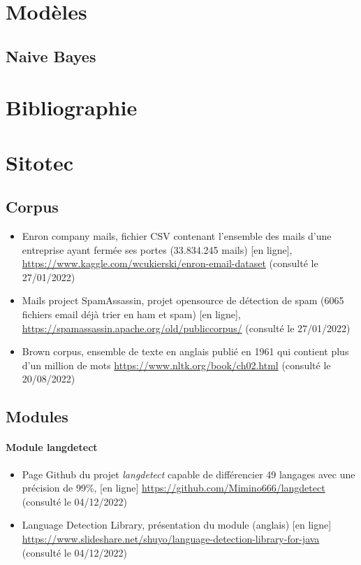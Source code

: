 \documentclass[a4paper,12pt]{article}
\begin{document}
	\section{Modèles}	
		\subsection{Naive Bayes}
	
	\section{Bibliographie}
	
	\section{Sitotec}
		\subsection{Corpus}
			\begin{itemize}
				\item Enron company mails, fichier CSV contenant l'ensemble des mails d'une entreprise ayant fermée ses portes (33.834.245 mails) [en ligne], \url{https://www.kaggle.com/wcukierski/enron-email-dataset} (consulté le 27/01/2022) \label{Enron_dataset}
				\item Mails project SpamAssassin, projet opensource de détection de spam (6065 fichiers email déjà trier en ham et spam) [en ligne], \url{https://spamassassin.apache.org/old/publiccorpus/} (consulté le 27/01/2022) \label{SpamAssassin_dataset}
				\item Brown corpus, ensemble de texte en anglais publié en 1961 qui contient plus d'un million de mots \url{https://www.nltk.org/book/ch02.html} (consulté le 20/08/2022) \label{Brown_corpus}
			\end{itemize}
		
		\subsection{Modules}
			\paragraph{Module langdetect}
			\begin{itemize}
				\item Page Github du projet \emph{langdetect} capable de différencier 49 langages avec une précision de 99\%, [en ligne] \url{https://github.com/Mimino666/langdetect} (consulté le 04/12/2022) \label{langdetect}
				\item Language Detection Library, présentation du module (anglais) [en ligne] \url{https://www.slideshare.net/shuyo/language-detection-library-for-java} (consulté le 04/12/2022)
			\end{itemize}
		
		
\end{document}
